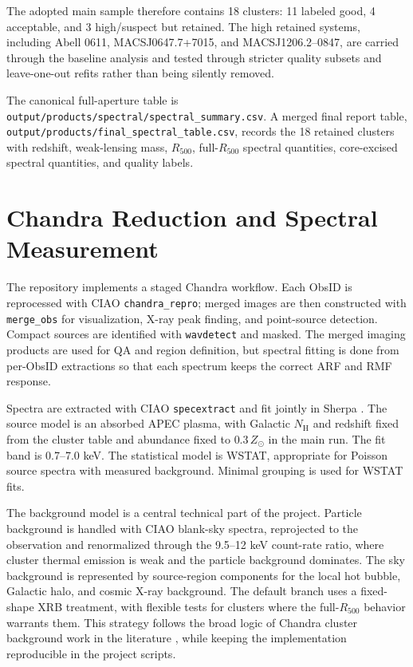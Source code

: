 \documentclass[11pt]{article}
\newcommand{\Rfive}{\ensuremath{R_{500}}}
\begin{document}
The adopted main sample therefore contains 18 clusters: 11 labeled good, 4 acceptable, and 3 high/suspect but retained. The high retained systems, including Abell 0611, MACSJ0647.7+7015, and MACSJ1206.2--0847, are carried through the baseline analysis and tested through stricter quality subsets and leave-one-out refits rather than being silently removed.

The canonical full-aperture table is \texttt{output/products/spectral/spectral\_summary.csv}. A merged final report table, \texttt{output/products/final\_spectral\_table.csv}, records the 18 retained clusters with redshift, weak-lensing mass, \Rfive{}, full-\Rfive{} spectral quantities, core-excised spectral quantities, and quality labels.

\section{Chandra Reduction and Spectral Measurement}

The repository implements a staged Chandra workflow. Each ObsID is reprocessed with CIAO \texttt{chandra\_repro}; merged images are then constructed with \texttt{merge\_obs} for visualization, X-ray peak finding, and point-source detection. Compact sources are identified with \texttt{wavdetect} and masked. The merged imaging products are used for QA and region definition, but spectral fitting is done from per-ObsID extractions so that each spectrum keeps the correct ARF and RMF response.

Spectra are extracted with CIAO \texttt{specextract} and fit jointly in Sherpa \citep{fruscione2006}. The source model is an absorbed APEC plasma, with Galactic $N_{\mathrm{H}}$ and redshift fixed from the cluster table and abundance fixed to $0.3\,Z_\odot$ in the main run. The fit band is 0.7--7.0 keV. The statistical model is WSTAT, appropriate for Poisson source spectra with measured background. Minimal grouping is used for WSTAT fits.

The background model is a central technical part of the project. Particle background is handled with CIAO blank-sky spectra, reprojected to the observation and renormalized through the 9.5--12 keV count-rate ratio, where cluster thermal emission is weak and the particle background dominates. The sky background is represented by source-region components for the local hot bubble, Galactic halo, and cosmic X-ray background. The default branch uses a fixed-shape XRB treatment, with flexible tests for clusters where the full-\Rfive{} behavior warrants them. This strategy follows the broad logic of Chandra cluster background work in the literature \citep[e.g.][]{vikhlinin2009,donahue2014}, while keeping the implementation reproducible in the project scripts.
\end{document}
